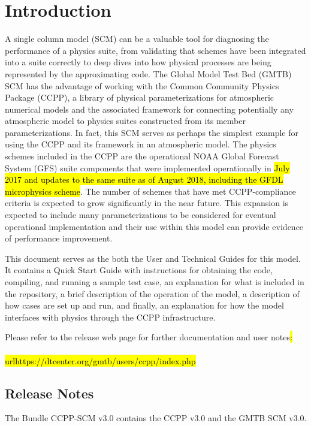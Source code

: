 \chapter{Introduction}
\label{chapter: introduction}

A single column model (SCM) can be a valuable tool for diagnosing the performance of a physics suite, from validating that schemes have been integrated into a suite correctly to deep dives into how physical processes are being represented by the approximating code. The Global Model Test Bed (GMTB) SCM has the advantage of working with the Common Community Physics Package (CCPP), a library of physical parameterizations for atmospheric numerical models and the associated framework for connecting potentially any atmospheric model to physics suites constructed from its member parameterizations. In fact, this SCM serves as perhaps the simplest example for using the CCPP and its framework in an atmospheric model. The physics schemes included in the CCPP are the operational NOAA Global Forecast System (GFS) suite components that were implemented operationally in \hl{July 2017 and updates to the same suite as of August 2018, including the GFDL microphysics scheme}. The number of schemes that have met CCPP-compliance criteria is expected to grow significantly in the near future. This expansion is expected to include many parameterizations to be considered for eventual operational implementation and their use within this model can provide evidence of performance improvement.

This document serves as the both the User and Technical Guides for this model. It contains a Quick Start Guide with instructions for obtaining the code, compiling, and running a sample test case, an explanation for what is included in the repository, a brief description of the operation of the model, a description of how cases are set up and run, and finally, an explanation for how the model interfaces with physics through the CCPP infrastructure.

Please refer to the release web page for further documentation and user notes\hl{:\\ \\url{https://dtcenter.org/gmtb/users/ccpp/index.php}}

\section{Release Notes}

The Bundle CCPP-SCM v3.0 contains the CCPP v3.0 and the GMTB SCM v3.0.

